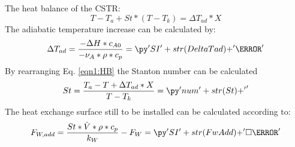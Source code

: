 \begin{solution}
The heat balance of the CSTR:
%
\begin{equation}\label{eqn1:HB}
T - T_a + St*(T - T_k) = \Delta T_{ad} * X
\end{equation}
%
The adiabatic temperature increase can be calculated by:
%
\begin{equation}
\Delta T_{ad} = \frac{-\Delta H * c_{A0}}{-\nu_A * \rho * c_p} = \pySI{DeltaTad}{\kelvin} 
\end{equation}
%
By rearranging Eq. \ref{eqn1:HB} the Stanton number can be calculated
%
\begin{equation}
St = \frac{T_a - T + \Delta T_{ad} * X}{T - T_k} = \pyNum{St}
\end{equation}
%
The heat exchange surface still to be installed can be calculated according to:
%
\begin{equation}
F_{W,add} = \frac{St * \dot{V} * \rho * c_p}{k_W} - F_W = \pySI{FwAdd}{\square\meter}
\end{equation}
\end{solution}